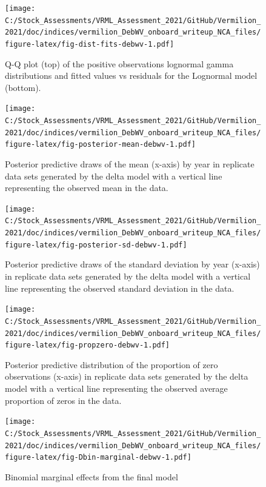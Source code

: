 \documentclass[11pt,
  english,
]{article}
\begin{document}
\begin{figure}
\centering
\texttt{[image: C:/Stock\_Assessments/VRML\_Assessment\_2021/GitHub/Vermilion\_2021/doc/indices/vermilion\_DebWV\_onboard\_writeup\_NCA\_files/figure-latex/fig-dist-fits-debwv-1.pdf]}
\caption{\label{fig:fig-dist-fits-debwv}Q-Q plot (top) of the positive observations lognormal gamma distributions and fitted values vs residuals for the Lognormal model (bottom).}
\end{figure}

\begin{figure}
\centering
\texttt{[image: C:/Stock\_Assessments/VRML\_Assessment\_2021/GitHub/Vermilion\_2021/doc/indices/vermilion\_DebWV\_onboard\_writeup\_NCA\_files/figure-latex/fig-posterior-mean-debwv-1.pdf]}
\caption{\label{fig:fig-posterior-mean-debwv}Posterior predictive draws of the mean (x-axis) by year in replicate data sets generated by the delta model with a vertical line representing the observed mean in the data.}
\end{figure}

\FloatBarrier

\begin{figure}
\centering
\texttt{[image: C:/Stock\_Assessments/VRML\_Assessment\_2021/GitHub/Vermilion\_2021/doc/indices/vermilion\_DebWV\_onboard\_writeup\_NCA\_files/figure-latex/fig-posterior-sd-debwv-1.pdf]}
\caption{\label{fig:fig-posterior-sd-debwv}Posterior predictive draws of the standard deviation by year (x-axis) in replicate data sets generated by the delta model with a vertical line representing the observed standard deviation in the data.}
\end{figure}

\begin{figure}
\centering
\texttt{[image: C:/Stock\_Assessments/VRML\_Assessment\_2021/GitHub/Vermilion\_2021/doc/indices/vermilion\_DebWV\_onboard\_writeup\_NCA\_files/figure-latex/fig-propzero-debwv-1.pdf]}
\caption{\label{fig:fig-propzero-debwv}Posterior predictive distribution of the proportion of zero observations (x-axis) in replicate data sets generated by the delta model with a vertical line representing the observed average proportion of zeros in the data.}
\end{figure}

\begin{figure}
\centering
\texttt{[image: C:/Stock\_Assessments/VRML\_Assessment\_2021/GitHub/Vermilion\_2021/doc/indices/vermilion\_DebWV\_onboard\_writeup\_NCA\_files/figure-latex/fig-Dbin-marginal-debwv-1.pdf]}
\caption{\label{fig:fig-Dbin-marginal-debwv}Binomial marginal effects from the final model}
\end{figure}
\end{document}
